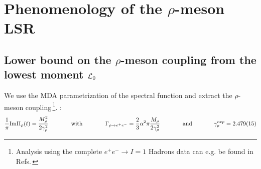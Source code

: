 \documentclass[aps,prd,groupedaddress,nofootinbib]{revtex4-1}
\def\beq{\begin{equation}}
\def\eeq{\end{equation}}
\begin{document}
\section{Phenomenology of the $\rho$-meson LSR}
\subsection{Lower bound on the $\rho$-meson coupling from the lowest moment ${\cal L}_0$}
We use the MDA parametrization of the spectral function and extract the $\rho$-meson coupling\,\footnote{Analysis using the complete $e^+e^-\to I=1$ Hadrons data can e.g. be found in Refs.\,\cite{LNT,SNe23}}.  :
\beq
\frac{1}{\pi} \mbox{Im}\Pi_\rho(t) =\frac{M_\rho^2}{2\gamma_\rho^2}\,~~~~~~~~~~~{\rm with}\,~~~~~~~~~~~
\Gamma_{\rho\to e^+e^-}=\frac{2}{3}\alpha^2\pi\frac{M_\rho}{2\gamma_\rho^2}\,  ~~~~~~~~~~~ {\rm and} ~~~~~~~~~~~\gamma_\rho^{exp}= 2.479(15)
\eeq
\end{document}

